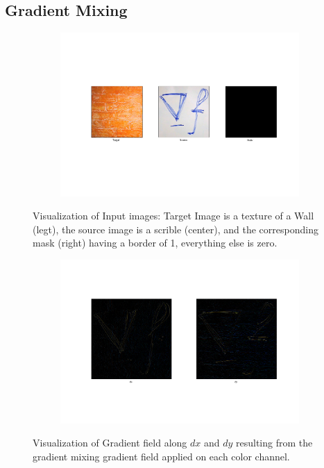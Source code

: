 \documentclass{paper}
\begin{document}
\subsection{Gradient Mixing}

\begin{figure}[H]
    \centering
    \begin{subfigure}{1.0\textwidth}
        \includegraphics[width=\textwidth]{../../outputs/p4/gradient_mixing/input}
    \end{subfigure}
    \caption{Visualization of Input images: Target Image is a texture of a Wall (legt), the source image is a scrible (center), and the corresponding mask (right) having a border of 1, everything else is zero.}
    \label{fig:gradient_mixing_input}       
\end{figure}


\begin{figure}[H]
    \centering
    \begin{subfigure}{1.0\textwidth}
        \includegraphics[width=\textwidth]{../../outputs/p4/gradient_mixing/gradients}
    \end{subfigure}
    \caption{Visualization of Gradient field along $dx$ and $dy$ resulting from the gradient mixing gradient field applied on each color channel.}
    \label{fig:gradient_mixing_gradients}       
\end{figure}
\end{document}
